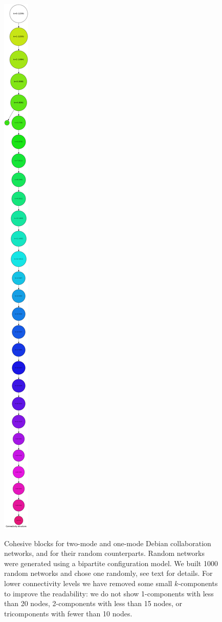 \begin{landscape}
\begin{figure}[p]
{\includegraphics[scale=0.08]{figures/cohesive_blocks_lenny_1mode_random}
}
\caption[Cohesive blocks for two-mode and one-mode Debian networks.]{Cohesive blocks for two-mode and one-mode Debian collaboration networks, and for their random counterparts. Random networks were generated using a bipartite configuration model. We built 1000 random networks and chose one randomly, see text for details. For lower connectivity levels we have removed some small $k$-components to improve the readability: we do not show 1-components with less than 20 nodes, 2-components with less than 15 nodes, or tricomponents with fewer than 10 nodes.}
\label{fig:cb_lenny_all}
\end{figure}
\end{landscape}

